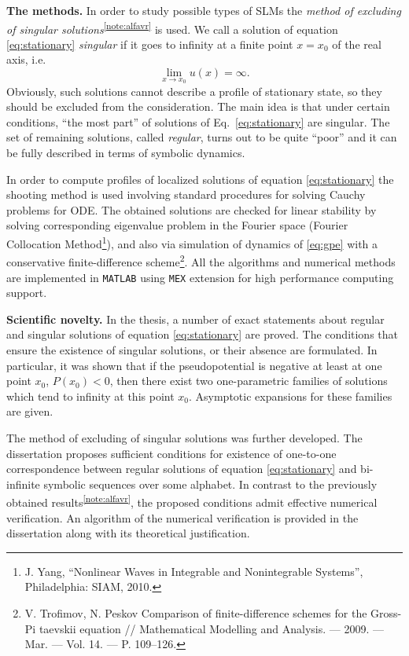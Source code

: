 \documentclass[candidate, href, colorlinks]{disser}
\begin{document}
\textbf{The methods.}
In order to study possible types of SLMs the {\it method of excluding of singular solutions}\textsuperscript{\ref{note:alfavr}} is used.
We call a solution of equation \eqref{eq:stationary} {\it singular} if it goes to infinity at a finite point $x = x_0$ of the real axis, i.e.
\begin{equation}
	\lim \limits_{x \to x_0} u(x) = \infty.
\end{equation}
Obviously, such solutions cannot describe a profile of stationary state, so they should be excluded from the consideration.
The main idea is that under certain conditions, ``the most part'' of solutions of Eq.~\eqref{eq:stationary} are singular.
The set of remaining solutions, called {\it regular}, turns out to be quite ``poor'' and it can be fully described in terms of symbolic dynamics.

In order to compute profiles of localized solutions of equation \eqref{eq:stationary} the shooting method is used involving standard procedures for solving Cauchy problems for ODE.
The obtained solutions are checked for linear stability by solving corresponding eigenvalue problem in the Fourier space (Fourier Collocation Method\footnote{J. Yang, ``Nonlinear Waves in Integrable and Nonintegrable Systems'', Philadelphia: SIAM, 2010.}), and also via simulation of dynamics of \eqref{eq:gpe} with a conservative finite-difference scheme\footnote{V. Trofimov, N. Peskov Comparison of finite-difference schemes for the Gross-Pi­ taevskii equation // Mathematical Modelling and Analysis. — 2009. — Mar. — Vol. 14. — P. 109–126.}.
All the algorithms and numerical methods are implemented in {\tt MATLAB} using {\tt MEX} extension for high performance computing support.

\textbf{Scientific novelty.}
In the thesis, a number of exact statements about regular and singular solutions of equation \eqref{eq:stationary} are proved.
The conditions that ensure the existence of singular solutions, or their absence are formulated.
In particular, it was shown that if the pseudopotential is negative at least at one point $x_0$, $P(x_0) < 0$, then there exist two one-parametric families of solutions which tend to infinity at this point $x_0$.
Asymptotic expansions for these families are given.

The method of excluding of singular solutions was further developed.
The dissertation proposes sufficient conditions for existence of one-to-one correspondence between regular solutions of equation \eqref{eq:stationary} and bi-infinite symbolic sequences over some alphabet. 
In contrast to the previously obtained results\textsuperscript{\ref{note:alfavr}}, the proposed conditions admit effective numerical verification.
An algorithm of the numerical verification is provided in the dissertation along with its theoretical justification.
\end{document}
